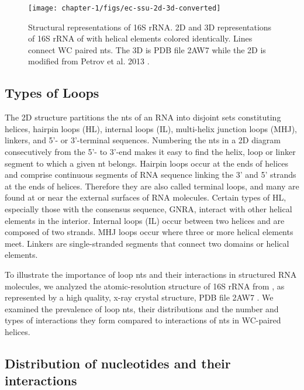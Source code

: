 \begin{landscape}
  \begin{figure}
    \texttt{[image: chapter-1/figs/ec-ssu-2d-3d-converted]}
    \caption{Structural representations of \EC{} 16S rRNA. 2D and 3D
      representations of 16S rRNA of \EC{} with helical elements colored
      identically. Lines connect WC paired nts. The 3D is PDB file 2AW7
      \cite{Schuwirth2005} while the 2D is modified from Petrov et al. 2013
      \cite{Petrov2013a}.}
    \label{fig:ec-ssu-2d-3d}
  \end{figure}
\end{landscape}

\subsection{Types of Loops }

The 2D structure partitions the nts of an RNA into disjoint sets constituting
helices, hairpin loops (HL), internal loops (IL), multi-helix junction loops
(MHJ), linkers, and 5’- or 3’-terminal sequences. Numbering the nts in a 2D
diagram consecutively from the 5’- to 3’-end makes it easy to find the helix,
loop or linker segment to which a given nt belongs. Hairpin loops occur at the
ends of helices and comprise continuous segments of RNA sequence linking the 3’
and 5’ strands at the ends of helices. Therefore they are also called terminal
loops, and many are found at or near the external surfaces of RNA molecules.
Certain types of HL, especially those with the consensus sequence, GNRA,
interact with other helical elements in the interior. Internal loops (IL) occur
between two helices and are composed of two strands. MHJ loops occur where three
or more helical elements meet. Linkers are single-stranded segments that connect
two domains or helical elements. 

To illustrate the importance of loop nts and their interactions in structured
RNA molecules, we analyzed the atomic-resolution structure of 16S rRNA from \EC,
as represented by a high quality, x-ray crystal structure, PDB file 2AW7
\cite{Schuwirth2005}. We examined the prevalence of loop nts, their
distributions and the number and types of interactions they form compared to
interactions of nts in WC-paired helices. 

\subsection{Distribution of nucleotides and their interactions}

